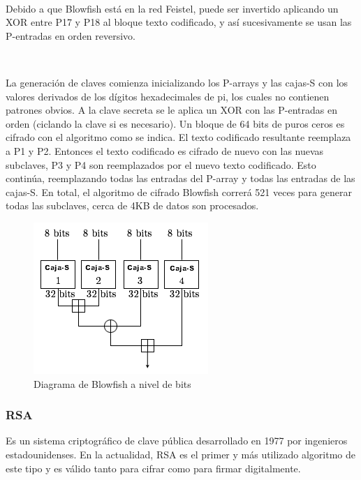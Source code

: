 \documentclass[11pt, conference]{IEEEtran}
\begin{document}
\

Debido a que Blowfish está en la red Feistel, puede ser invertido aplicando un XOR entre P17 y P18 al bloque texto codificado, y así sucesivamente se usan las P-entradas en orden reversivo.

\

La generación de claves comienza inicializando los P-arrays y las cajas-S con los valores derivados de los dígitos hexadecimales de pi, los cuales no contienen patrones obvios. A la clave secreta se le aplica un XOR con las P-entradas en orden (ciclando la clave si es necesario). Un bloque de 64 bits de puros ceros es cifrado con el algoritmo como se indica. El texto codificado resultante reemplaza a P1 y P2. Entonces el texto codificado es cifrado de nuevo con las nuevas subclaves, P3 y P4 son reemplazados por el nuevo texto codificado. Esto continúa, reemplazando todas las entradas del P-array y todas las entradas de las cajas-S. En total, el algoritmo de cifrado Blowfish correrá 521 veces para generar todas las subclaves, cerca de 4KB de datos son procesados.

\bigskip\bigskip\bigskip

\begin{figure}[h]
	\begin{center}
		\includegraphics[scale=0.9]{BlowfishFuncionF.png}
		\caption{Diagrama de Blowfish a nivel de bits} 
	\end{center}
\end{figure}

\pagebreak

\subsubsection{RSA}
Es un sistema criptográfico de clave pública desarrollado en 1977 por ingenieros estadounidenses. En la actualidad, RSA es el primer y más utilizado algoritmo de este tipo y es válido tanto para cifrar como para firmar digitalmente.
\end{document}

